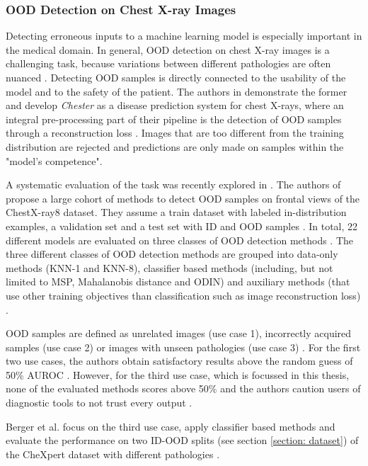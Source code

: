 \subsubsection{OOD Detection on Chest X-ray Images}
\label{section: OOD detection on Chest X-ray Images}
Detecting erroneous inputs to a machine learning model is especially important in the medical domain.
In general, OOD detection on chest X-ray images is a challenging task, because variations between different pathologies are often nuanced \citep{Salehi2022}.
Detecting OOD samples is directly connected to the usability of the model and to the safety of the patient.
The authors in \citep{Cohen2019} demonstrate the former and develop \textit{Chester} as a disease prediction system for chest X-rays, where an integral pre-processing part of their pipeline is the detection of OOD samples through a reconstruction loss \citep{Dumoulin2017}. 
Images that are too different from the training distribution are rejected \citep{Cohen2019} and predictions are only made on samples within the "model's competence".
\par
A systematic evaluation of the task was recently explored in \citep{Cao2020}.
The authors of \citep{Cao2020} propose a large cohort of methods to detect OOD samples on frontal views of the ChestX-ray8 \citep{Wang2017} dataset.
They assume a train dataset with labeled in-distribution examples, a validation set and a test set with ID and OOD samples \citep{Cao2020}.
In total, 22 different models are evaluated on three classes of OOD detection methods \citep{Cao2020}.
The three different classes of OOD detection methods are grouped into data-only methods (KNN-1 and KNN-8), classifier based methods (including, but not limited to MSP, Mahalanobis distance and ODIN) and auxiliary methods (that use other training objectives than classification such as image reconstruction loss) \citep{Cao2020}.
\par
OOD samples are defined as unrelated images (use case 1), incorrectly acquired samples (use case 2) or images with unseen pathologies (use case 3) \citep{Cao2020}.
For the first two use cases, the authors obtain satisfactory results above the random guess of 50\% AUROC \citep{Cao2020}.
However, for the third use case, which is focussed in this thesis, none of the evaluated methods scores above 50\% and the authors caution users of diagnostic tools to not trust every output \citep{Cao2020}.
\par
Berger et al. focus \citep{Berger2021} on the third use case, apply classifier based methods and evaluate the performance on two ID-OOD splits (see section \ref{section: dataset}) of the CheXpert dataset \citep{Irvin2019} with different pathologies \citep{Berger2021}.
